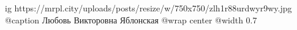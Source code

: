  
 
 
 
 

\ifcmt
  ig https://mrpl.city/uploads/posts/resize/w/750x750/zlh1r88urdwyr9wy.jpg
	@caption Любовь Викторовна Яблонская
  @wrap center
  @width 0.7
\fi
